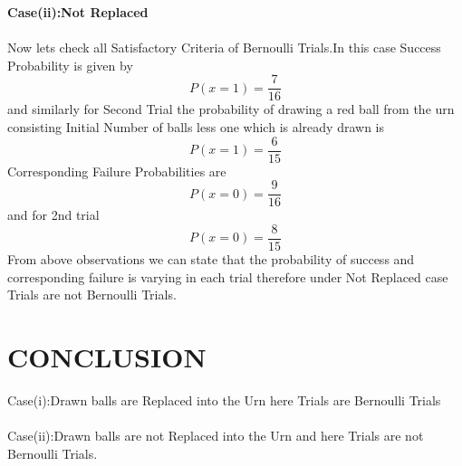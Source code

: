 \documentclass[journal,12pt,twocolumn]{IEEEtran}
\begin{document}
\textbf{Case(ii):Not Replaced} \\ \\
Now lets check all Satisfactory Criteria of Bernoulli Trials.In this case Success Probability is given by
\begin{equation*}
    P(x=1) =\frac{7}{16}
\end{equation*}
 and similarly for Second Trial the probability of  drawing a red ball from the urn consisting Initial Number of balls less one which is already drawn is
 \begin{equation*}
     P(x=1) = \frac{6}{15} 
 \end{equation*} 
 Corresponding Failure Probabilities are 
 \begin{equation*}
     P(x=0) = \frac{9}{16}
 \end{equation*} and for 2nd trial 
 \begin{equation*}
     P(x=0) = \frac{8}{15}
 \end{equation*}  
 From above observations we can state that  the probability of success and corresponding failure is varying in each trial therefore under Not Replaced case Trials are not Bernoulli Trials. 
\section{CONCLUSION}
Case(i):Drawn balls are Replaced into the Urn here
Trials are Bernoulli Trials \\ \\
Case(ii):Drawn balls are not Replaced into the Urn and here 
Trials are not Bernoulli Trials.
\end{document}
